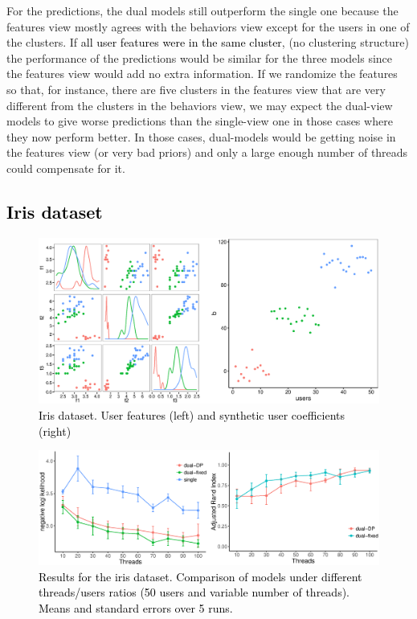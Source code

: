 \documentclass[smallextended]{svjour3}          %
\newcommand\alberto[1]{\textcolor{black}{#1}}
\begin{document}
 
For the predictions, the dual models still outperform the single one because the features view mostly agrees with the behaviors view except for the users in one of the clusters. If \alberto{all user features were in the same cluster}, (no clustering structure) the performance of the predictions would be similar for the three models since the features view would add no extra information. If we randomize the features so that, for instance, there are five clusters in the features view that are very different from the clusters in the behaviors view, we may expect the dual-view  models to give worse predictions than the single-view one in those cases where they now perform better. In those cases, dual-models would be getting noise in the features view (or very bad priors) and only a large enough number of threads could compensate for it.

\subsection{\alberto{Iris dataset}}
\begin{figure}
	\centering
	\includegraphics[width=1\textwidth]{Fig7_data_iris}
	\caption{\alberto{Iris dataset. User features (left) and synthetic user coefficients (right)}}
	\label{fig:iris_data}
\end{figure}
\begin{figure}
	\centering
	\includegraphics[width=1\textwidth]{Fig8_results_iris}
	\caption{\alberto{Results for the iris dataset. Comparison of models under different threads/users ratios (50 users and variable number of threads). Means and standard errors over 5 runs.}}
	\label{fig:iris_results}
\end{figure}
\end{document}
